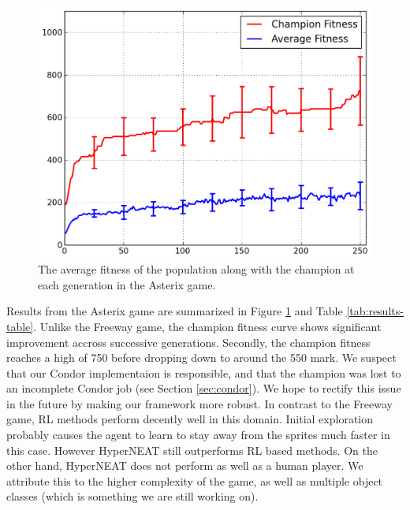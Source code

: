 \documentclass{acm_proc_article-sp}
\begin{document}
\begin{figure}[ht]
\begin{center}
\includegraphics[width=\columnwidth]{figures/asterix-results.png}
\end{center}
\caption{The average fitness of the population along with the champion at each generation in the Asterix game.}
\label{fig:asterix-curve}
\end{figure}

Results from the Asterix game are summarized in Figure \ref{fig:asterix-curve} and Table \ref{tab:results-table}. Unlike the Freeway game, the champion fitness curve shows significant improvement accross successive generations. Secondly, the champion fitness reaches a high of 750 before dropping down to around the 550 mark. We suspect that our Condor implementaion is responsible, and that the champion was lost to an incomplete Condor job (see Section \ref{sec:condor}). We hope to rectify this issue in the future by making our framework more robust. In contrast to the Freeway game, RL methods perform decently well in this domain. Initial exploration probably causes the agent to learn to stay away from the sprites much faster in this case. However HyperNEAT still outperforms RL based methods. On the other hand, HyperNEAT does not perform as well as a human player. We attribute this to the higher complexity of the game, as well as multiple object classes (which is something we are still working on). 
\end{document}
